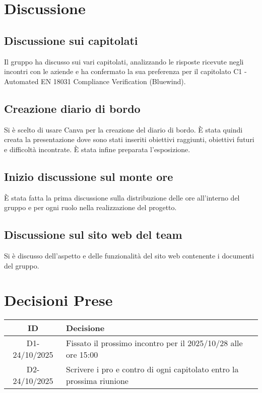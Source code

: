 \documentclass[a4paper,12pt]{article}
\begin{document}
\section{Discussione}{
	\subsection{Discussione sui capitolati}{
		Il gruppo ha discusso sui vari capitolati, analizzando le risposte ricevute negli incontri con le aziende e ha confermato la sua preferenza per il capitolato C1 - Automated EN 18031 Compliance Verification (Bluewind).
}
	\subsection{Creazione diario di bordo}{
		Si è scelto di usare Canva per la creazione del diario di bordo. È stata quindi creata la presentazione dove sono stati inseriti obiettivi raggiunti, obiettivi futuri e difficoltà incontrate. È stata infine preparata l'esposizione.
}
	\subsection{Inizio discussione sul monte ore}{
		È stata fatta la prima discussione sulla distribuzione delle ore all'interno del gruppo e per ogni ruolo nella realizzazione del progetto.
}
	\subsection{Discussione sul sito web del team}{
		Si è discusso dell'aspetto e delle funzionalità del sito web contenente i documenti del gruppo.	
}
}


\section{Decisioni Prese}{
    \begin{center}
    \begin{tabular}{|c|p{11cm}|}
        \hline
        \textbf{ID} & \textbf{Decisione} \\
        \hline
            D1-24/10/2025 & Fissato il prossimo incontro per il 2025/10/28 alle ore 15:00 \\
        \hline
	D2-24/10/2025 & Scrivere i pro e contro di ogni capitolato entro la prossima riunione \\
        \hline
    \end{tabular}
    \end{center}
}
\end{document}

